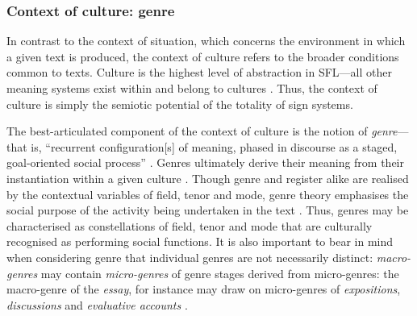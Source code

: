 
		 

		 \subsubsection{Context of culture: genre} \label{genre}

			\noindent In contrast to the context of situation, which concerns the environment in which a given text is produced, the context of culture refers to the broader conditions common to texts. Culture is the highest level of abstraction in SFL---all other meaning systems exist within and belong to cultures \cite{halliday_language_1989}. Thus, the context of culture is simply the semiotic potential of the totality of sign systems. 

			The best-articulated component of the context of culture is the notion of \emph{genre}---that is, ``recurrent configuration[s] of meaning, phased in discourse as a staged, goal-oriented social process'' \cite[p.~9]{martin_genre-based_2013}. Genres ultimately derive their meaning from their instantiation within a given culture \cite[p.~99]{halliday_language_1989}. Though genre and register alike are realised by the contextual variables of field, tenor and mode, genre theory emphasises the social purpose of the activity being undertaken in the text \cite{woodward-kron_disciplinary_2002}. Thus, genres may be characterised as constellations of field, tenor and mode that are culturally recognised as performing social functions. It is also important to bear in mind when considering genre that individual genres are not necessarily distinct: \emph{macro-genres} may contain \emph{micro-genres} of genre stages derived from micro-genres: the macro-genre of the \emph{essay}, for instance may draw on micro-genres of \emph{expositions}, \emph{discussions} and \emph{evaluative accounts} \cite{woodward-kron_disciplinary_2002}.

			~\\


